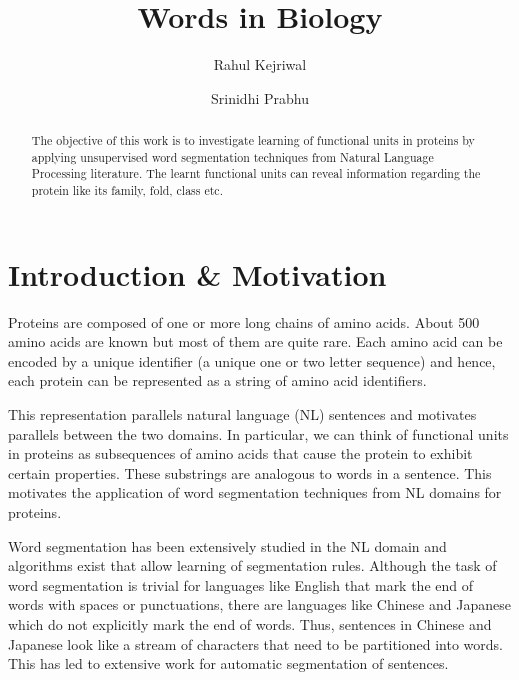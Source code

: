 \documentclass[runningheads]{llncs}
\begin{document}
%
\title{Words in Biology}
%
%
\author{Rahul Kejriwal \and Srinidhi Prabhu}
%
%
%
\maketitle              %
%

\begin{abstract}
The objective of this work is to investigate learning of functional units in proteins by applying unsupervised word segmentation techniques from Natural Language Processing literature. The learnt functional units can reveal information regarding the protein like its family, fold, class etc.

\end{abstract}

\section{Introduction \& Motivation}

Proteins are composed of one or more long chains of amino acids. About 500 amino acids are known but most of them are quite rare. Each amino acid can be encoded by a unique identifier (a unique one or two letter sequence) and hence, each protein can be represented as a string of amino acid identifiers.

This representation parallels natural language (NL) sentences and motivates parallels between the two domains. In particular, we can think of functional units in proteins as subsequences of amino acids that cause the protein to exhibit certain properties. These substrings are analogous to words in a sentence. This motivates the application of word segmentation techniques from NL domains for proteins. 

Word segmentation has been extensively studied in the NL domain and algorithms exist that allow learning of segmentation rules. Although the task of word segmentation is trivial for languages like English that mark the end of words with spaces or punctuations, there are languages like Chinese and Japanese which do not explicitly mark the end of words. Thus, sentences in Chinese and Japanese look like a stream of characters that need to be partitioned into words. This has led to extensive work for automatic segmentation of sentences. 
\end{document}
